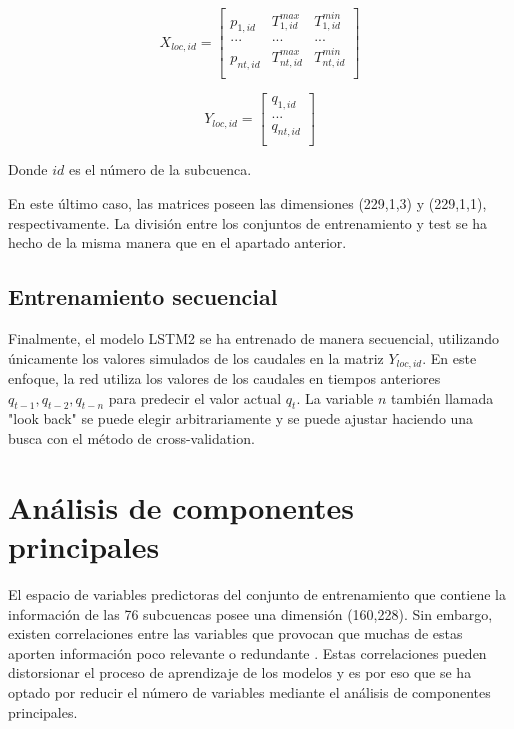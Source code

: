\begin{equation*}
    X_{loc,id}= 
    \begin{bmatrix}
        p_{1,id} & T^{max}_{1,id} &  T^{min}_{1,id} \\
        ... & ... &  ... \\
        p_{nt,id} & T^{max}_{nt,id} &  T^{min}_{nt,id} \\
        \end{bmatrix}
\end{equation*}

\vspace{5mm}


\begin{equation*}
    Y_{loc,id}= 
    \begin{bmatrix}
        q_{1,id}  \\
        ...  \\
        q_{nt,id}  \\
        \end{bmatrix}
\end{equation*}

\vspace{5mm}

Donde $id$ es el número de la subcuenca. 
\vspace{5mm}

En este último caso, las matrices poseen las dimensiones (229,1,3) y (229,1,1), respectivamente. 
La división entre los conjuntos de entrenamiento y test se ha hecho de la misma manera que en el apartado anterior.

\subsection{Entrenamiento secuencial}

Finalmente, el modelo LSTM2 se ha entrenado de manera secuencial, utilizando únicamente los valores simulados de los caudales 
en la matriz $Y_{loc,id}$. En este enfoque, la red utiliza los valores de los caudales en tiempos anteriores
 $q_{t-1}, q_{t-2}, q_{t-n}$ para predecir el valor actual $q_{t}$. 
 La variable $n$ también llamada "look back" se puede elegir arbitrariamente y se puede ajustar haciendo 
 una busca con el método de cross-validation.


\section{Análisis de componentes principales}

El espacio de variables predictoras del conjunto de entrenamiento 
que contiene la información de las 76 subcuencas posee una dimensión (160,228).
Sin embargo, existen correlaciones entre las variables que 
provocan que muchas de estas aporten información poco relevante o redundante \cite{Manu}. 
Estas correlaciones pueden distorsionar el proceso de aprendizaje de los modelos \cite{gutierrez} 
y es por eso que se ha optado por reducir el número de variables mediante el análisis de componentes principales\cite{PCA}.

